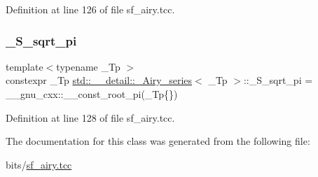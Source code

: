 Definition at line 126 of file sf\+\_\+airy.\+tcc.

\mbox{\label{classstd_1_1____detail_1_1__Airy__series_a3fd1fba37ef8beb0d89854d4e58b8a38}} 
\subsubsection{\texorpdfstring{\+\_\+\+S\+\_\+sqrt\+\_\+pi}{\_S\_sqrt\_pi}}
{\footnotesize\ttfamily template$<$typename \+\_\+\+Tp $>$ \\
constexpr \+\_\+\+Tp \hyperlink{classstd_1_1____detail_1_1__Airy__series}{std\+::\+\_\+\+\_\+detail\+::\+\_\+\+Airy\+\_\+series}$<$ \+\_\+\+Tp $>$\+::\+\_\+\+S\+\_\+sqrt\+\_\+pi = \+\_\+\+\_\+gnu\+\_\+cxx\+::\+\_\+\+\_\+const\+\_\+root\+\_\+pi(\+\_\+\+Tp\{\})\hspace{0.3cm}{\ttfamily [static]}}



Definition at line 128 of file sf\+\_\+airy.\+tcc.



The documentation for this class was generated from the following file\+:\begin{DoxyCompactItemize}
\item 
bits/\hyperlink{sf__airy_8tcc}{sf\+\_\+airy.\+tcc}\end{DoxyCompactItemize}
